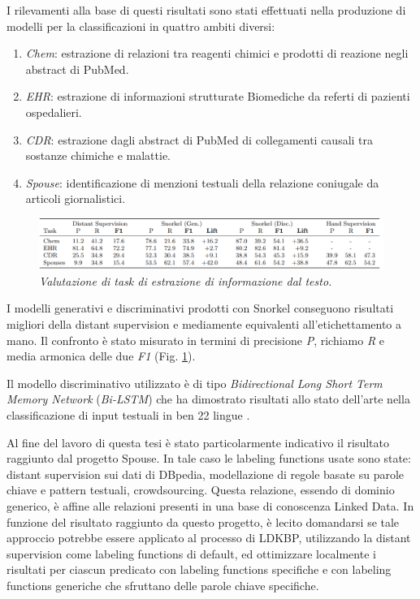 I rilevamenti alla base di questi risultati sono stati effettuati nella produzione di modelli per la classificazioni in quattro ambiti diversi: 
\begin{enumerate}
\item \textit{Chem}: estrazione di relazioni tra reagenti chimici e prodotti di reazione negli abstract di PubMed.
\item \textit{EHR}: estrazione di informazioni strutturate Biomediche da referti di pazienti ospedalieri.
\item \textit{CDR}: estrazione dagli abstract di PubMed di collegamenti causali tra sostanze chimiche e malattie.
\item \textit{Spouse}: identificazione di menzioni testuali della relazione coniugale da articoli giornalistici.
\end{enumerate}

\begin{figure}[htb]
	\includegraphics[width=\textwidth]{gfx/snorkel_eval.pdf}  
	\caption{\textit{Valutazione di task di estrazione di informazione dal testo.}}
	\label{fig:literature_review:snorkel_eval}
\end{figure}

I modelli generativi e discriminativi prodotti con Snorkel conseguono risultati migliori della distant supervision e mediamente equivalenti all'etichettamento a mano. Il confronto è stato misurato in termini di precisione \textit{P}, richiamo \textit{R} e media armonica delle due \textit{F1} (Fig. \ref{fig:literature_review:snorkel_eval}).

Il modello discriminativo utilizzato è di tipo \textit{Bidirectional Long Short Term Memory Network} (\textit{Bi-LSTM}) che ha dimostrato risultati allo stato dell'arte nella classificazione di input testuali in ben 22 lingue \cite{DBLP:journals/corr/PlankSG16}.

Al fine del lavoro di questa tesi è stato particolarmente indicativo il risultato raggiunto dal progetto Spouse. In tale caso le labeling functions usate sono state: distant supervision sui dati di DBpedia, modellazione di regole basate su parole chiave e pattern testuali, crowdsourcing. Questa relazione, essendo di dominio generico, è affine alle relazioni presenti in una base di conoscenza Linked Data. In funzione del risultato raggiunto da questo progetto, è lecito domandarsi se tale approccio potrebbe essere applicato al processo di LDKBP, utilizzando la distant supervision come labeling functions di default, ed ottimizzare localmente i risultati per ciascun predicato con labeling functions specifiche e con labeling functions generiche che sfruttano delle parole chiave specifiche. 










